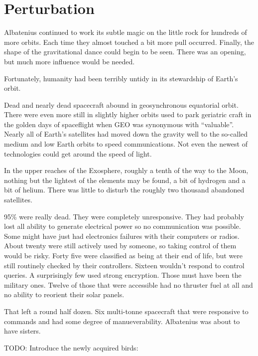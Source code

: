 %
%

\chapter{Perturbation}

Albatenius continued to work its subtle magic on the little rock for hundreds of more orbits. Each time they almost touched a bit more pull occurred. Finally, the shape of the gravitational dance could begin to be seen. There was an opening, but much more influence would be needed.

Fortunately, humanity had been terribly untidy in its stewardship of Earth's orbit.

Dead and nearly dead spacecraft abound in geosynchronous equatorial orbit. There were even more still in slightly higher orbits used to park geriatric craft in the golden days of spaceflight when GEO was synonymous with ``valuable''. Nearly all of Earth's satellites had moved down the gravity well to the so-called medium and low Earth orbits to speed communications. Not even the newest of technologies could get around the speed of light.

In the upper reaches of the Exosphere, roughly a tenth of the way to the Moon, nothing but the lightest of the elements may be found, a bit of hydrogen and a bit of helium. There was little to disturb the roughly two thousand abandoned satellites.

95\% were really dead. They were completely unresponsive. They had probably lost all ability to generate electrical power so no communication was possible. Some might have just had electronics failures with their computers or radios. About twenty were still actively used by someone, so taking control of them would be risky. Forty five were classified as being at their end of life, but were still routinely checked by their controllers. Sixteen wouldn't respond to control queries. A surprisingly few used strong encryption. Those must have been the military ones. Twelve of those that were accessible had no thruster fuel at all and no ability to reorient their solar panels.

That left a round half dozen. Six multi-tonne spacecraft that were responsive to commands and had some degree of manueverability. Albatenius was about to have sisters.

TODO: Introduce the newly acquired birds:

